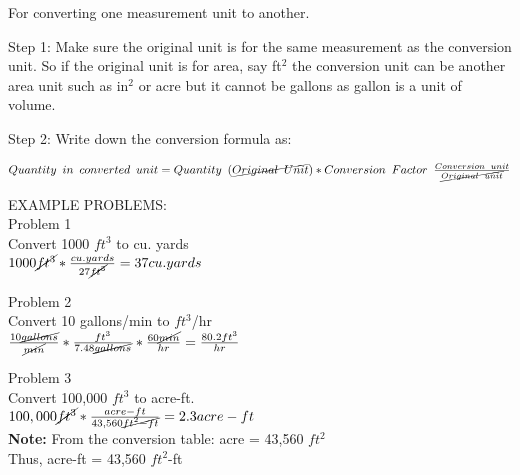 For converting one measurement unit to another.

Step 1:  Make sure the original unit is for the same measurement as the conversion unit.  So if the original unit is for area, say ft$^2$ the conversion unit can be another area unit such as in$^2$ or acre but it cannot be gallons as gallon is a unit of volume.

Step 2: Write down the conversion formula as:

$Quantity \enspace in \enspace converted \enspace unit = Quantity \enspace (\cancel{Original \enspace Unit}) *   Conversion  \enspace Factor \enspace  \frac{Conversion \enspace unit}{\cancel{Original \enspace unit}}$


EXAMPLE PROBLEMS:\\

Problem 1\\
Convert 1000 $ft^3$ to cu. yards\\

$1000 \cancel{ft^3}*\frac{cu.yards}{27\cancel{ft^3}} = 37 cu.yards$

Problem 2\\
Convert 10 gallons/min to $ft^3$/hr\\

$\frac{10 \cancel{gallons}}{\cancel{min}}*  \frac{ft^3}{7.48 \cancel{gallons}}  * \frac{60 \cancel{min}}{hr}   = \frac{80.2ft^3}{hr}$


Problem 3\\
Convert 100,000 $ft^3$ to acre-ft.\\
$100,000 \cancel{ft^3} * \frac{acre-ft}{43,560 \cancel{ft^2-ft}} =  2.3 acre-ft$\\
\textbf{Note:} From the conversion table: acre = 43,560 $ft^2$\\
Thus, acre-ft  = 43,560 $ft^2$-ft\\




